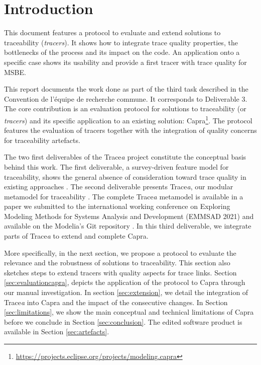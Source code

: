 
%	



\section{Introduction}\label{sect:intro}
This document features a protocol to evaluate and extend solutions to traceability (\textit{tracers}). It shows how to integrate trace quality properties, the bottlenecks of the process and its impact on the code. An application onto a specific case shows its usability and provide a first tracer with trace quality for MSBE.
\sideboxend


This report documents the work done as part of the third task described in the Convention de l’équipe de recherche commune. It corresponds to Deliverable 3. The core contribution is an evaluation protocol for solutions to traceability (or \textit{tracers}) and its specific application to an existing solution: Capra\footnote{\url{https://projects.eclipse.org/projects/modeling.capra}}. The protocol features the evaluation of tracers together with the integration of quality concerns for traceability artefacts. 

The two first deliverables of the Trace\textit{a} project constitute the conceptual basis behind this work. The first deliverable, a survey-driven feature model for traceability, shows the general absence of consideration toward trace quality in existing approaches \cite{deliverable1}. The second deliverable presents Trace\textit{a}, our modular metamodel for traceability \cite{deliverable2}. The complete Trace\textit{a} metamodel is available in a paper we submitted to the international working conference on Exploring Modeling Methods for Systems Analysis and Development (EMMSAD 2021) and available on the Modelia's Git repository \cite{Tracea_Repo}. In this third deliverable, we integrate parts of Trace\textit{a} to extend and complete Capra.

More specifically, in the next section, we propose a protocol to evaluate the relevance and the robustness of solutions to traceability. This section also sketches steps to extend tracers with quality aspects for trace links. Section \ref{sec:evaluationcapra}, depicts the application of the protocol to Capra through our manual investigation. In section \ref{sec:extension}, we detail the integration of Trace\textit{a} into Capra and the impact of the consecutive changes. In Section \ref{sec:limitations}, we show the main conceptual and technical limitations of Capra before we conclude in Section \ref{sec:conclusion}. The edited software product is available in Section \ref{sec:artefacts}.

